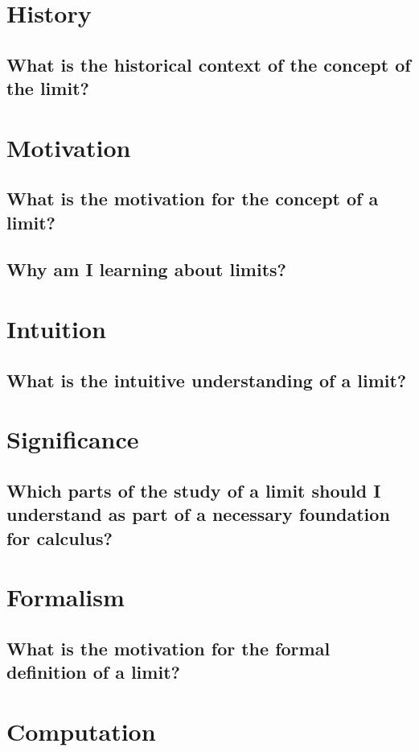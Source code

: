 \section{History}
\subsection{What is the historical context of the concept of the limit?}

\section{Motivation}
\subsection{What is the motivation for the concept of a limit?}
\subsection{Why am I learning about limits?}

\section{Intuition}
\subsection{What is the intuitive understanding of a limit?}

\section{Significance}
\subsection{Which parts of the study of a limit should I understand as part of a necessary foundation for calculus?}

\section{Formalism}
\subsection{What is the motivation for the formal definition of a limit?}

\section{Computation}

